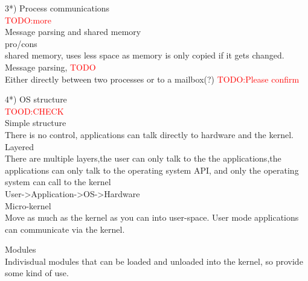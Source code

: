 \documentclass[a4paper,10pt,titlepage]{report}
\begin{document}
3*)
Process communications\\ \textcolor{red}{TODO:more} \\
\hspace{10mm}Message parsing and shared memory \\ 
\hspace{15mm} pro/cons \\
\hspace{10mm} shared memory, uses less space as memory is only copied if it gets changed.\\
\hspace{10mm} Message parsing, \textcolor{red}{TODO} \\
\hspace{15mm} Either directly between two processes or to a mailbox(?)  \textcolor{red}{TODO:Please confirm}
\vspace{5mm}


4*) 
OS structure \\ 
\textcolor{red}{TOOD:CHECK} \\


\hspace{10mm}	Simple structure \\
\hspace{15mm}    	There is no control, applications can talk directly to hardware and the kernel.\\


\hspace{10mm}    Layered \\
\hspace{15mm}    	There are multiple layers,the user can only talk to the the applications,the applications can only talk to the operating system API, and only the operating system can call to the kernel \\
\hspace{15mm}        User->Application->OS->Hardware \\

\hspace{10mm}	Micro-kernel\\
\hspace{15mm}		Move as much as the kernel as you can into user-space. User mode applications can communicate via the kernel.
    
\hspace{10mm}   Modules \\
\hspace{15mm}		Indivisdual modules that can be loaded and unloaded into the kernel, so provide some kind of use.
                
\end{document}
